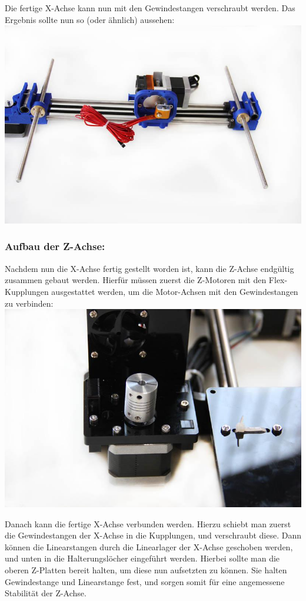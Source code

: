 Die fertige X-Achse kann nun mit den Gewindestangen verschraubt werden. Das Ergebnis sollte nun so (oder ähnlich) aussehen:\\
\includegraphics[clip=true, trim=0 100 0 100, width=\textwidth]{Bilder/X_Assembly_3.jpg}

\subsubsection{Aufbau der Z-Achse:}
Nachdem nun die X-Achse fertig gestellt worden ist, kann die Z-Achse endgültig zusammen gebaut werden.
Hierfür müssen zuerst die Z-Motoren mit den Flex-Kupplungen ausgestattet werden, um die Motor-Achsen mit den Gewindestangen zu verbinden:\\
\includegraphics[width=\textwidth, clip=true, trim=0 30 0 70]{Bilder/Z_Assembly_5.jpg}

Danach kann die fertige X-Achse verbunden werden. Hierzu schiebt man zuerst die Gewindestangen der X-Achse in die Kupplungen, und verschraubt diese. Dann können die Linearstangen durch die Linearlager der X-Achse geschoben werden, und unten in die Halterungslöcher eingeführt werden. Hierbei sollte man die oberen Z-Platten bereit halten, um diese nun aufsetzten zu können. Sie halten Gewindestange und Linearstange fest, und sorgen somit für eine angemessene Stabilität der Z-Achse.

